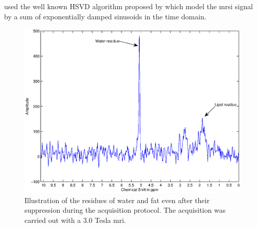 \begin{enumerate}[leftmargin=*]
	\cite{Kelm2007} used the well known HSVD algorithm proposed by \cite{Pijnappel1992} which model the \ac{mrsi} signal by a sum of exponentially damped sinusoids in the time domain.%
%
%

\begin{figure}
\centering
	\includegraphics[width=0.9\linewidth]{03_image_processing/03_preprocessing/figures/water/water_fat.eps}
	\caption{Illustration of the residues of water and fat even after their suppression during the acquisition protocol. The acquisition was carried out with a 3.0 Tesla \ac{mri}.}
	\label{fig:waterfat}
\end{figure}
	

\end{enumerate}
